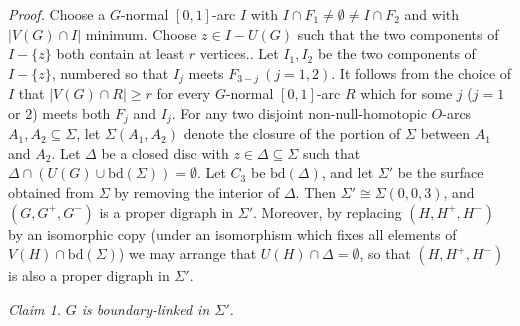\textit{Proof.} Choose a $G$-normal $[0, 1]$-arc $I$ with $I \cap F_1 \ne \emptyset \ne I \cap F_2$ and with $|V(G) \cap I|$ minimum. Choose $z \in I - U(G)$ such that the two components of $I - \{z\}$ both contain at least $r$ vertices.. Let $I_1, I_2$ be the two components of $I - \{z\}$, numbered so that $I_j$ meets $F_{3-j} \ (j = 1, 2)$. It follows from the choice of $I$ that $|V(G) \cap R| \ge r$ for every $G$-normal $[0, 1]$-arc $R$ which for some $j$ ($j = 1$ or $2$) meets both $F_j$ and $I_j$. For any two disjoint non-null-homotopic $O$-arcs $A_1, A_2 \subseteq \Sigma$, let $\Sigma(A_1, A_2)$ denote the closure of the portion of $\Sigma$ between $A_1$ and $A_2$. Let $\Delta$ be a closed disc with $z \in \Delta \subseteq \Sigma$ such that $\Delta \cap (U(G) \cup \mathrm{bd}(\Sigma)) = \emptyset$. Let $C_3$ be $\mathrm{bd}(\Delta)$, and let $\Sigma'$ be the surface obtained from $\Sigma$ by removing the interior of $\Delta$. Then $\Sigma' \cong \Sigma(0, 0, 3)$, and $(G, G^+, G^-)$ is a proper digraph in $\Sigma'$. Moreover, by replacing $(H, H^+, H^-)$ by an isomorphic copy (under an isomorphism which fixes all elements of $V(H) \cap \mathrm{bd}(\Sigma)$) we may arrange that $U(H) \cap \Delta = \emptyset$, so that $(H, H^+, H^-)$ is also a proper digraph in $\Sigma'$.

\textit{Claim 1.} \textit{$G$ is boundary-linked in $\Sigma'$.}
